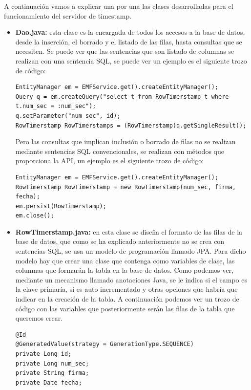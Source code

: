 A continuación vamos a explicar una por una las clases desarrolladas para el funcionamiento del servidor de timestamp.

\begin{itemize}

\item \textbf{Dao.java:} esta clase es la encargada de todos los accesos a la base de datos, desde la inserción, el borrado y el listado de las filas, hasta consultas que se necesiten. Se puede ver que las sentencias que son listado de columnas se realizan con una sentencia SQL, se puede ver un ejemplo es el siguiente trozo de código:

\begin{lstlisting}[style=Java]
EntityManager em = EMFService.get().createEntityManager();
Query q = em.createQuery("select t from RowTimerstamp t where t.num_sec = :num_sec");
q.setParameter("num_sec", id);
RowTimerstamp RowTimerstamps = (RowTimerstamp)q.getSingleResult();
\end{lstlisting}

Pero las consultas que implican inclusión o borrado de filas no se realizan mediante sentencias SQL convencionales, se realizan con métodos que proporciona la API, un ejemplo es el siguiente trozo de código:

\begin{lstlisting}[style=Java]
EntityManager em = EMFService.get().createEntityManager();
RowTimerstamp RowTimerstamp = new RowTimerstamp(num_sec, firma, fecha);
em.persist(RowTimerstamp);
em.close();
\end{lstlisting}

\item \textbf{RowTimerstamp.java:} en esta clase se diseña el formato de las filas de la base de datos, que como se ha explicado anteriormente no se crea con sentencias SQL, se usa un modelo de programación llamado JPA. Para dicho modelo hay que crear una clase que contenga como variables de clase, las columnas que formarán la tabla en la base de datos. Como podemos ver, mediante un mecanismo llamado anotaciones Java, se le indica si el campo es la clave primaría, si es auto incrementado y otras opciones que habría que indicar en la creación de la tabla. A continuación podemos ver un trozo de código con las variables que posteriormente serán las filas de la tabla que queremos crear.  

\begin{lstlisting}[style=Java]
@Id
@GeneratedValue(strategy = GenerationType.SEQUENCE)
private Long id;
private Long num_sec;
private String firma;
private Date fecha;
\end{lstlisting}


\end{itemize}
